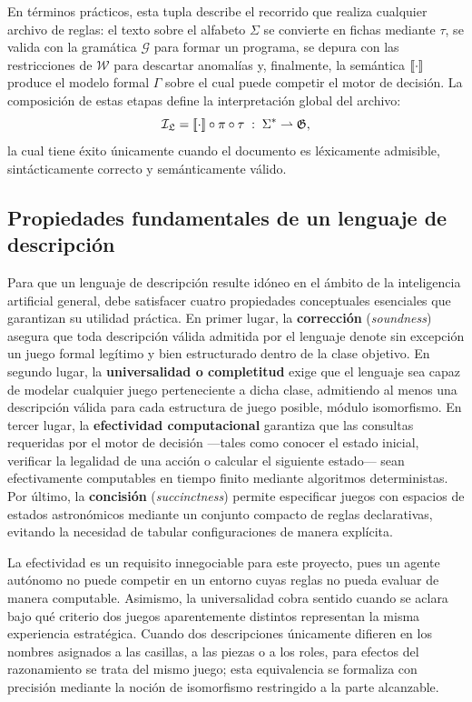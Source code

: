 En términos prácticos, esta tupla describe el recorrido que realiza cualquier archivo de reglas: el texto sobre el alfabeto $\Sigma$ se convierte en fichas mediante $\tau$, se valida con la gramática $\mathcal G$ para formar un programa, se depura con las restricciones de $\mathcal W$ para descartar anomalías y, finalmente, la semántica $[\![\cdot]\!]$ produce el modelo formal $\Gamma$ sobre el cual puede competir el motor de decisión. La composición de estas etapas define la interpretación global del archivo:
\begin{equation}
    \mathcal I_{\mathfrak L} = [\![\cdot]\!] \circ \pi \circ \tau \; : \; \Sigma^* \rightharpoonup \mathfrak G ,
    \label{eq:an_interpretacion}
\end{equation}
la cual tiene éxito únicamente cuando el documento es léxicamente admisible, sintácticamente correcto y semánticamente válido.

\subsection{Propiedades fundamentales de un lenguaje de descripción}

Para que un lenguaje de descripción resulte idóneo en el ámbito de la inteligencia artificial general, debe satisfacer cuatro propiedades conceptuales esenciales que garantizan su utilidad práctica. En primer lugar, la \textbf{corrección} (\textit{soundness}) asegura que toda descripción válida admitida por el lenguaje denote sin excepción un juego formal legítimo y bien estructurado dentro de la clase objetivo. En segundo lugar, la \textbf{universalidad o completitud} exige que el lenguaje sea capaz de modelar cualquier juego perteneciente a dicha clase, admitiendo al menos una descripción válida para cada estructura de juego posible, módulo isomorfismo. En tercer lugar, la \textbf{efectividad computacional} garantiza que las consultas requeridas por el motor de decisión —tales como conocer el estado inicial, verificar la legalidad de una acción o calcular el siguiente estado— sean efectivamente computables en tiempo finito mediante algoritmos deterministas. Por último, la \textbf{concisión} (\textit{succinctness}) permite especificar juegos con espacios de estados astronómicos mediante un conjunto compacto de reglas declarativas, evitando la necesidad de tabular configuraciones de manera explícita.

La efectividad es un requisito innegociable para este proyecto, pues un agente autónomo no puede competir en un entorno cuyas reglas no pueda evaluar de manera computable. Asimismo, la universalidad cobra sentido cuando se aclara bajo qué criterio dos juegos aparentemente distintos representan la misma experiencia estratégica. Cuando dos descripciones únicamente difieren en los nombres asignados a las casillas, a las piezas o a los roles, para efectos del razonamiento se trata del mismo juego; esta equivalencia se formaliza con precisión mediante la noción de isomorfismo restringido a la parte alcanzable.

